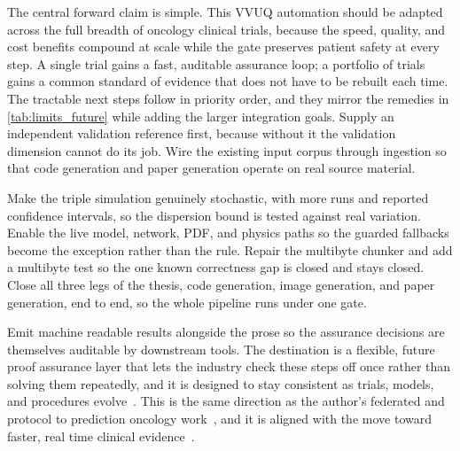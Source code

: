 The central forward claim is simple. This VVUQ automation should be adapted across
the full breadth of oncology clinical trials, because the speed, quality, and cost
benefits compound at scale while the gate preserves patient safety at every step.
A single trial gains a fast, auditable assurance loop; a portfolio of trials gains
a common standard of evidence that does not have to be rebuilt each time. The
tractable next steps follow in priority order, and they mirror the remedies in
\autoref{tab:limits_future} while adding the larger integration goals. Supply an
independent validation reference first, because without it the validation
dimension cannot do its job. Wire the existing input corpus through ingestion so
that code generation and paper generation operate on real source material.

Make the triple simulation genuinely stochastic, with more runs and reported
confidence intervals, so the dispersion bound is tested against real variation.
Enable the live model, network, PDF, and physics paths so the guarded fallbacks
become the exception rather than the rule. Repair the multibyte chunker and add a
multibyte test so the one known correctness gap is closed and stays closed. Close
all three legs of the thesis, code generation, image generation, and paper
generation, end to end, so the whole pipeline runs under one gate. 

Emit
machine readable results alongside the prose so the assurance decisions are
themselves auditable by downstream tools. The destination is a flexible, future
proof assurance layer that lets the industry check these steps off once rather
than solving them repeatedly, and it is designed to stay consistent as trials,
models, and procedures evolve~\cite{repo-cancer-automated, sel2025vvuq}. This is
the same direction as the author's federated and protocol to prediction oncology
work~\cite{kawchak2026federated, kawchak2025qsppdac}, and it is aligned with the
move toward faster, real time clinical evidence~\cite{fda2026realtime}.
